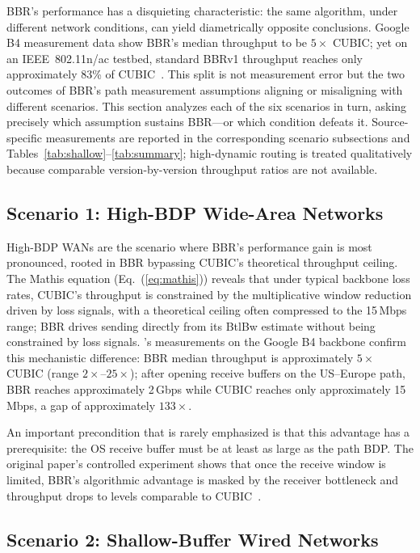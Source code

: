 \documentclass[a4paper,fleqn]{cas-sc}
\begin{document}
BBR's performance has a disquieting characteristic: the same algorithm, under
different network conditions, can yield diametrically opposite conclusions.
Google B4 measurement data show BBR's median throughput to be $5\times$ CUBIC;
yet on an IEEE~802.11n/ac testbed, standard BBRv1 throughput reaches only
approximately 83\% of CUBIC~\citep{grazia2020bbrp}. This split is not measurement error but the two outcomes of BBR's
path measurement assumptions aligning or misaligning with different scenarios.
This section analyzes each of the six scenarios in turn, asking precisely which
assumption sustains BBR---or which condition defeats it. Source-specific
measurements are reported in the corresponding scenario subsections and
Tables~\ref{tab:shallow}--\ref{tab:summary}; high-dynamic routing is treated
qualitatively because comparable version-by-version throughput ratios are not
available.

\subsection{Scenario 1: High-BDP Wide-Area Networks}
\label{sec:wan}

High-BDP WANs are the scenario where BBR's performance gain is most pronounced,
rooted in BBR bypassing CUBIC's theoretical throughput ceiling. The Mathis
equation (Eq.~(\ref{eq:mathis})) reveals that under typical backbone loss rates,
CUBIC's throughput is constrained by the multiplicative window reduction driven
by loss signals, with a theoretical ceiling often compressed to the 15\,Mbps
range; BBR drives sending directly from its BtlBw estimate without being
constrained by loss signals. \citet{cardwell2017bbr}'s measurements on the
Google B4 backbone confirm this mechanistic difference: BBR median throughput is
approximately $5\times$ CUBIC (range $2\times$--$25\times$); after opening
receive buffers on the US--Europe path, BBR reaches approximately 2\,Gbps while
CUBIC reaches only approximately 15\,Mbps, a gap of approximately $133\times$.

An important precondition that is rarely emphasized is that this advantage has a
prerequisite: the OS receive buffer must be at least as large as the path BDP.
The original paper's controlled experiment shows that once the receive window is
limited, BBR's algorithmic advantage is masked by the receiver bottleneck and
throughput drops to levels comparable to CUBIC~\citep{cardwell2017bbr}.

\subsection{Scenario 2: Shallow-Buffer Wired Networks}
\label{sec:shallow}
\end{document}

